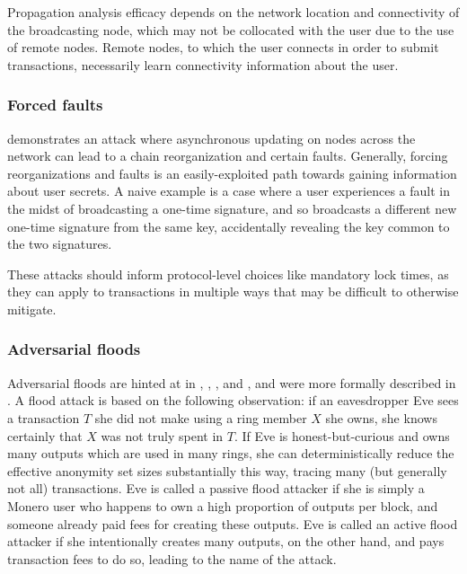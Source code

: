 \documentclass{article}
\theoremstyle{definition}
\begin{document}
Propagation analysis efficacy depends on the network location and connectivity of the broadcasting node, which may not be collocated with the user due to the use of remote nodes.
Remote nodes, to which the user connects in order to submit transactions, necessarily learn connectivity information about the user.


\subsubsection{Forced faults}

\cite{wijaya2019risk} demonstrates an attack where asynchronous updating on nodes across the network can lead to a chain reorganization and certain faults.
Generally, forcing reorganizations and faults is an easily-exploited path towards gaining information about user secrets.
A naive example is a case where a user experiences a fault in the midst of broadcasting a one-time signature, and so broadcasts a different new one-time signature from the same key, accidentally revealing the key common to the two signatures.

These attacks should inform protocol-level choices like mandatory lock times, as they can apply to transactions in multiple ways that may be difficult to otherwise mitigate.


\subsubsection{Adversarial floods}\label{subsubsec:adversarial_floods}

Adversarial floods are hinted at in \cite{noether2014note}, \cite{kumar2017traceability}, \cite{miller2017empirical}, and \cite{moser2017empirical}, and were more formally described in \cite{chervinski2019floodxmr}.
A flood attack is based on the following observation: if an eavesdropper Eve sees a transaction $T$ she did not make using a ring member $X$ she owns, she knows certainly that $X$ was not truly spent in $T$.
If Eve is honest-but-curious and owns many outputs which are used in many rings, she can deterministically reduce the effective anonymity set sizes substantially this way, tracing many (but generally not all) transactions.
Eve is called a passive flood attacker if she is simply a Monero user who happens to own a high proportion of outputs per block, and someone already paid fees for creating these outputs.
Eve is called an active flood attacker if she intentionally creates many outputs, on the other hand, and pays transaction fees to do so, leading to the name of the attack.
\end{document}
